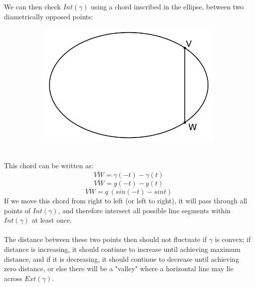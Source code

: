 \documentclass[12pt]{article}
\begin{document}
\clearpage
We can then check $Int(\gamma)$ using a chord inscribed in the ellipse, between two diametrically opposed points:\\
\begin{figure}[h!]
  \centering
      \begin{subfigure}[b]{0.5\linewidth}
    \includegraphics[width=\linewidth]{./assets/3-3-1/ellipse-vertical-chord.png}
  \end{subfigure}
  \end{figure}
  \\
  \indent
This chord can be written as:
$$
\overline{VW} = \gamma(-t) - \gamma(t)
$$
$$
\overline{VW} = y(-t) - y(t)
$$
$$
\overline{VW} = q \ (sin(-t)-sint)
$$
\indent
If we move this chord from right to left (or left to right), it will pass through all points of $Int(\gamma)$, and therefore intersect all possible line segments within $Int(\gamma)$ at least once.\\
\\
\indent
The distance between these two points then should not fluctuate if $\gamma$ is convex; if distance is increasing, it should continue to increase until achieving maximum distance, and if it is decreasing, it should continue to decrease until achieving zero distance, or else there will be a "valley" where a horizontal line may lie across $Ext(\gamma)$.
\end{document}
